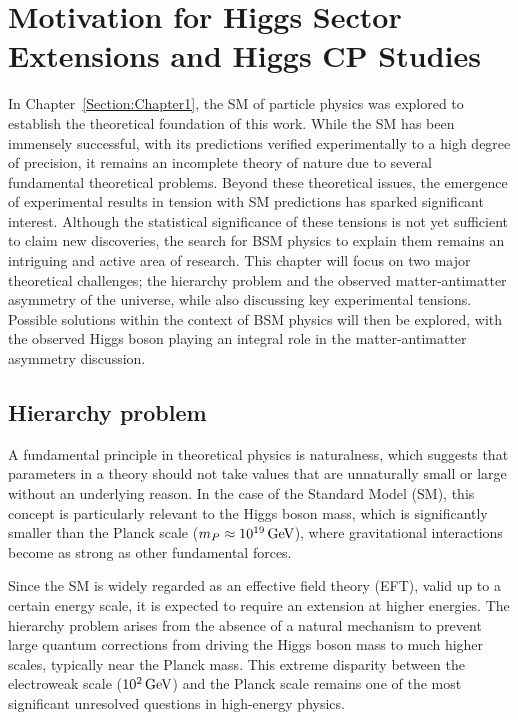 \chapter{Motivation for Higgs Sector Extensions and Higgs CP Studies}
\thispagestyle{plain}  %
\pagestyle{chapterpages}
\label{Section:Chapter2}

In Chapter~\ref{Section:Chapter1}, the SM of particle physics was explored to establish the theoretical foundation of this work. While the SM has been immensely successful, with its predictions verified experimentally to a high degree of precision, it remains an incomplete theory of nature due to several fundamental theoretical problems. Beyond these theoretical issues, the emergence of experimental results in tension with SM predictions has sparked significant interest. Although the statistical significance of these tensions is not yet sufficient to claim new discoveries, the search for BSM physics to explain them remains an intriguing and active area of research. This chapter will focus on two major theoretical challenges; the hierarchy problem and the observed matter-antimatter asymmetry of the universe, while also discussing key experimental tensions. Possible solutions within the context of BSM physics will then be explored, with the observed Higgs boson playing an integral role in the matter-antimatter asymmetry discussion.

\section{Hierarchy problem}

A fundamental principle in theoretical physics is naturalness, which suggests that parameters in a theory should not take values that are unnaturally small or large without an underlying reason. In the case of the Standard Model (SM), this concept is particularly relevant to the Higgs boson mass, which is significantly smaller than the Planck scale ($m_P \approx 10^{19} \,\text{Ge\hspace{-.08em}V}$), where gravitational interactions become as strong as other fundamental forces.

Since the SM is widely regarded as an effective field theory (EFT), valid up to a certain energy scale, it is expected to require an extension at higher energies. The hierarchy problem arises from the absence of a natural mechanism to prevent large quantum corrections from driving the Higgs boson mass to much higher scales, typically near the Planck mass. This extreme disparity between the electroweak scale ($10^2 \,\text{Ge\hspace{-.08em}V}$) and the Planck scale remains one of the most significant unresolved questions in high-energy physics.

